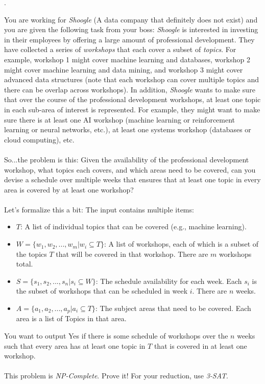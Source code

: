 \documentclass[12pt]{article}
\newcounter{quesnum}
\newcommand{\question}[2][??]{
\begin{list}{\labelitemi}{\leftmargin=2em}
\item [\arabic{quesnum}.] {} {#2}
\end{list}
\addtocounter{quesnum}{1}
}
\begin{document}
\question[3]{
You are working for \emph{Shoogle} (A data company that definitely does not exist) and you are given the following task from your boss: \emph{Shoogle} is interested in investing in their employees by offering a large amount of professional development. They have collected a series of \emph{workshops} that each cover a subset of \emph{topics}. For example, workshop 1 might cover machine learning and databases, workshop 2 might cover machine learning and data mining, and workshop 3 might cover advanced data structures (note that each workshop can cover multiple topics and there can be overlap across workshops). In addition, \emph{Shoogle} wants to make sure that over the course of the professional development workshops, at least one topic in each sub-area of interest is represented. For example, they might want to make sure there is at least one AI workshop (machine learning or reinforcement learning or neural networks, etc.), at least one systems workshop (databases or cloud computing), etc.\\
\\
So...the problem is this: Given the availability of the professional development workshop, what topics each covers, and which areas need to be covered, can you devise a schedule over multiple weeks that ensures that at least one topic in every area is covered by at least one workshop?\\
\\
Let's formalize this a bit: The input contains multiple items:

\begin{itemize}
    \item $T$: A list of individual topics that can be covered (e.g., machine learning).
    \item $W=\{w_1,w_2,...,w_m | w_i \subseteq T\}$: A list of workshops, each of which is a subset of the topics $T$ that will be covered in that workshop. There are $m$ workshops total.
    
    \item $S=\{s_1,s_2,...,s_n | s_i \subseteq W\}$: The schedule availability for each week. Each $s_i$ is the subset of workshops that can be scheduled in week $i$. There are $n$ weeks.
    \item $A= \{a_1,a_2,...,a_p | a_i \subseteq T\}$: The subject areas that need to be covered. Each area is a list of Topics in that area.
\end{itemize}

You want to output Yes if there is some schedule of workshops over the $n$ weeks such that every area has at least one topic in $T$ that is covered in at least one workshop.\\
\\
This problem is \emph{NP-Complete}. Prove it! For your reduction, use \emph{3-SAT}.
}

\vspace{12pt}
\end{document}
